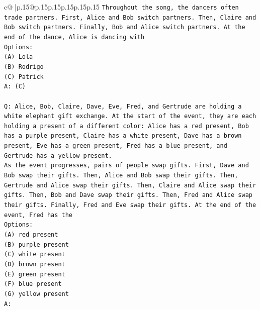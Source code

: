 \documentclass{article}
\begin{document}
{\begin{supertabular}{c@{$\;$}|p{.15\linewidth}@{}p{.15\linewidth}p{.15\linewidth}p{.15\linewidth}p{.15\linewidth}p{.15\linewidth}}
{{{\texttt{Throughout the song, the dancers often trade partners. First, Alice and Bob switch partners. Then, Claire and Bob switch partners. Finally, Bob and Alice switch partners. At the end of the dance, Alice is dancing with} \\
\texttt{Options:} \\
\texttt{(A) Lola} \\
\texttt{(B) Rodrigo} \\
\texttt{(C) Patrick} \\
\texttt{A: (C)} \\
\\ 
\texttt{Q: Alice, Bob, Claire, Dave, Eve, Fred, and Gertrude are holding a white elephant gift exchange. At the start of the event, they are each holding a present of a different color: Alice has a red present, Bob has a purple present, Claire has a white present, Dave has a brown present, Eve has a green present, Fred has a blue present, and Gertrude has a yellow present.} \\
\texttt{As the event progresses, pairs of people swap gifts. First, Dave and Bob swap their gifts. Then, Alice and Bob swap their gifts. Then, Gertrude and Alice swap their gifts. Then, Claire and Alice swap their gifts. Then, Bob and Dave swap their gifts. Then, Fred and Alice swap their gifts. Finally, Fred and Eve swap their gifts. At the end of the event, Fred has the} \\
\texttt{Options:} \\
\texttt{(A) red present} \\
\texttt{(B) purple present} \\
\texttt{(C) white present} \\
\texttt{(D) brown present} \\
\texttt{(E) green present} \\
\texttt{(F) blue present} \\
\texttt{(G) yellow present} \\
\texttt{A:} \\
            }
        }
    }
     \\ \\


\end{supertabular}}
\end{document}
